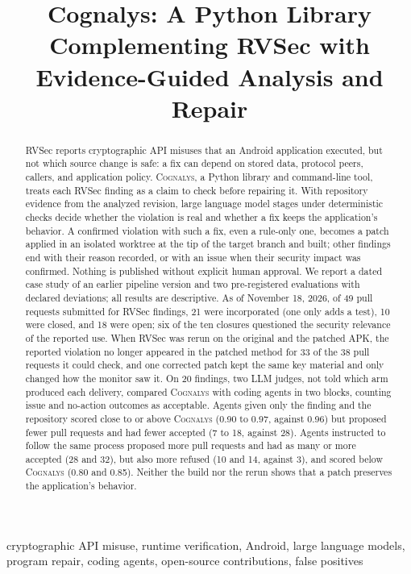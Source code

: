 \documentclass[conference]{IEEEtran}
\title{Cognalys: A Python Library Complementing RVSec with Evidence-Guided Analysis and Repair}
\author{\IEEEauthorblockN{João Pedro Antonow}
\IEEEauthorblockA{Department of Computer Engineering (CIC)\\
University of Brasilia (UnB)\\
Brasilia, Brazil\\
\texttt{jpantonow@gmail.com}}}
\newcommand{\system}{\textsc{Cognalys}}
\begin{document}
\maketitle

\begin{abstract}
RVSec reports cryptographic API misuses that an Android application executed,
but not which source change is safe: a fix can depend on stored data, protocol
peers, callers, and application policy. \system, a Python library and
command-line tool, treats each RVSec finding as a claim to check before
repairing it. With repository evidence from the analyzed revision, large
language model stages under deterministic checks decide whether the violation
is real and whether a fix keeps the application's behavior. A confirmed
violation with such a fix, even a rule-only one, becomes a patch applied in an
isolated worktree at the tip of the target branch and built; other findings
end with their reason recorded, or with an issue when their security impact
was confirmed. Nothing is published without explicit human approval.
We report a dated case study of an earlier pipeline version and two
pre-registered evaluations with declared deviations; all results are
descriptive. As of November 18, 2026, of 49 pull requests submitted for RVSec
findings, 21 were incorporated (one only adds a test), 10 were closed, and 18
were open; six of the ten closures questioned the security relevance of the
reported use. When RVSec was rerun on the original and the patched APK, the
reported violation no longer appeared in the patched method for 33 of
the 38 pull requests it could check, and one corrected patch kept
the same key material and only changed how the monitor saw it. On 20 findings, two LLM judges, not
told which arm produced each delivery, compared \system{} with coding agents in
two blocks, counting issue and no-action outcomes as acceptable. Agents given
only the finding and the repository scored close to or above \system{} (0.90
to 0.97, against 0.96) but proposed fewer pull requests and had fewer accepted
(7 to 18, against 28). Agents instructed to follow the same process proposed
more pull requests and had as many or more accepted (28 and 32), but also more
refused (10 and 14, against 3), and scored below \system{} (0.80 and 0.85). Neither the build nor the rerun shows that a patch preserves the
application's behavior.
\end{abstract}

\begin{IEEEkeywords}
cryptographic API misuse, runtime verification, Android, large language
models, program repair, coding agents, open-source contributions, false
positives
\end{IEEEkeywords}
\end{document}
